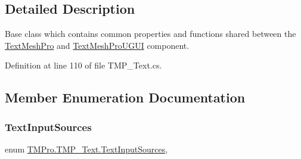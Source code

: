 \subsection{Detailed Description}
Base class which contains common properties and functions shared between the \mbox{\hyperlink{class_t_m_pro_1_1_text_mesh_pro}{Text\+Mesh\+Pro}} and \mbox{\hyperlink{class_t_m_pro_1_1_text_mesh_pro_u_g_u_i}{Text\+Mesh\+Pro\+U\+G\+UI}} component. 



Definition at line 110 of file T\+M\+P\+\_\+\+Text.\+cs.



\subsection{Member Enumeration Documentation}
\mbox{\label{class_t_m_pro_1_1_t_m_p___text_ad5e8f5f99ee7ce332ad3531b8ba0096d}} 
\subsubsection{\texorpdfstring{TextInputSources}{TextInputSources}}
{\footnotesize\ttfamily enum \mbox{\hyperlink{class_t_m_pro_1_1_t_m_p___text_ad5e8f5f99ee7ce332ad3531b8ba0096d}{T\+M\+Pro.\+T\+M\+P\+\_\+\+Text.\+Text\+Input\+Sources}}\hspace{0.3cm}{\ttfamily [strong]}, {\ttfamily [protected]}}

